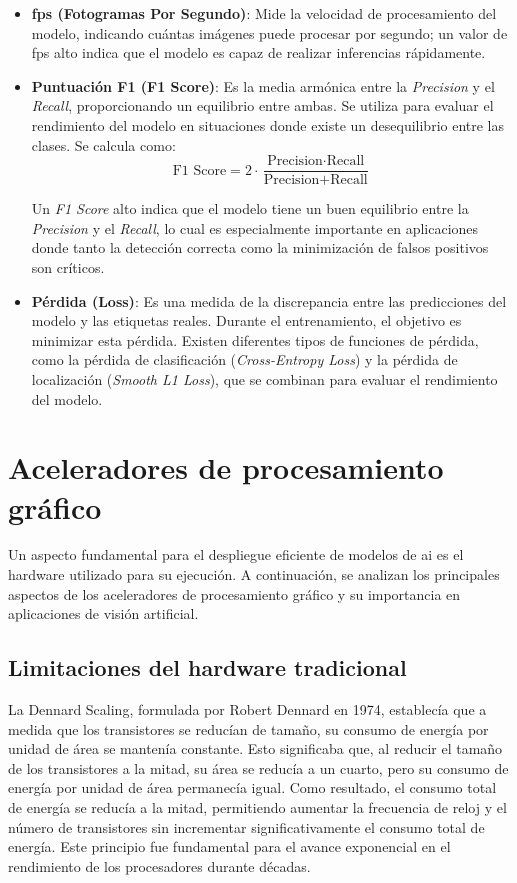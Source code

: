 \documentclass[11pt,spanish,listoffigures,listoftables]{tfgetsinf}
\begin{document}
\begin{itemize}
   \item \textbf{\gls{fps} (Fotogramas Por Segundo)}: Mide la velocidad de procesamiento del modelo, indicando cuántas imágenes puede procesar por segundo; un valor de \gls{fps} alto indica que el modelo es capaz de realizar inferencias rápidamente.
   \item \textbf{Puntuación F1 (F1 Score)}: Es la media armónica entre la \textit{Precision} y el \textit{Recall}, proporcionando un equilibrio entre ambas. Se utiliza para evaluar el rendimiento del modelo en situaciones donde existe un desequilibrio entre las clases. Se calcula como:
   \[
   \text{F1 Score} = 2 \cdot \frac{\text{Precision} \cdot \text{Recall}}{\text{Precision} + \text{Recall}}
   \]

   Un \textit{F1 Score} alto indica que el modelo tiene un buen equilibrio entre la \textit{Precision} y el \textit{Recall}, lo cual es especialmente importante en aplicaciones donde tanto la detección correcta como la minimización de falsos positivos son críticos.

   \item \textbf{Pérdida (Loss)}: Es una medida de la discrepancia entre las predicciones del modelo y las etiquetas reales. Durante el entrenamiento, el objetivo es minimizar esta pérdida. Existen diferentes tipos de funciones de pérdida, como la pérdida de clasificación (\textit{Cross-Entropy Loss}) y la pérdida de localización (\textit{Smooth L1 Loss}), que se combinan para evaluar el rendimiento del modelo.

\end{itemize}


\section{Aceleradores de procesamiento gráfico} \label{sec:hardware}
Un aspecto fundamental para el despliegue eficiente de modelos de \gls{ai} es el hardware utilizado para su ejecución. A continuación, se analizan los principales aspectos de los aceleradores de procesamiento gráfico y su importancia en aplicaciones de visión artificial.

\subsection{Limitaciones del hardware tradicional} \label{sec:limitaciones_hardware}

La Dennard Scaling\cite{dennard1974design}, formulada por Robert Dennard en 1974, establecía que a medida que los transistores se reducían de tamaño, su consumo de energía por unidad de área se mantenía constante. Esto significaba que, al reducir el tamaño de los transistores a la mitad, su área se reducía a un cuarto, pero su consumo de energía por unidad de área permanecía igual. Como resultado, el consumo total de energía se reducía a la mitad, permitiendo aumentar la frecuencia de reloj y el número de transistores sin incrementar significativamente el consumo total de energía. Este principio fue fundamental para el avance exponencial en el rendimiento de los procesadores durante décadas. 
\end{document}
